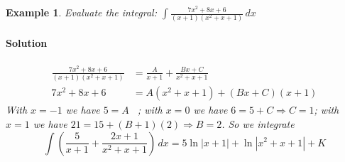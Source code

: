 \documentclass[letterpaper, 11pt, openany]{book}
\theoremstyle{mytheoremstyle}
\theoremstyle{myexamplestyle}
\newtheorem{example}{Example}[section]
\newenvironment{solution}{\paragraph{\sffamily \smaller \fontseries{b}\selectfont Solution}}{\hfill\faSquare}
\begin{document}
\begin{example}\label{e:parfracdirred2}
    Evaluate the integral: $\displaystyle \int \frac{7x^{2} + 8x + 6}{(x + 1)(x^{2} + x + 1)} \, dx$
    
    \begin{solution}
        \begin{align*}
            \frac{7x^{2} + 8x + 6}{(x + 1)(x^{2} + x + 1)} &= \frac{A}{x + 1} + \frac{Bx + C}{x^{2} + x + 1}\\[2ex]
            7x^{2} + 8x + 6 & = A(x^{2} + x + 1) + (Bx + C)(x + 1)
        \end{align*}
        With $x = -1$ we have $5 = A$ \faSmile \ ; with $x = 0$ we have $6 = 5 + C \Rightarrow C = 1$; with $x = 1$ we have $21 = 15 + (B + 1)(2) \Rightarrow B = 2$. So we integrate
        \[\int \left( \frac{5}{x + 1} + \frac{2x + 1}{x^{2} + x + 1} \right)\, dx = 5\ln |x + 1| + \ln |x^{2} + x + 1| + K\]
    \end{solution}
\end{example}
\end{document}
